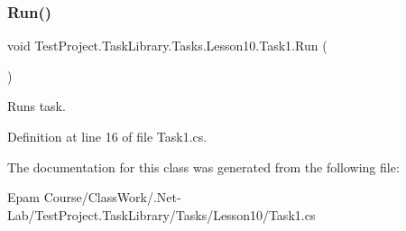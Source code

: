 \subsubsection{\texorpdfstring{Run()}{Run()}}
{\footnotesize\ttfamily void Test\+Project.\+Task\+Library.\+Tasks.\+Lesson10.\+Task1.\+Run (\begin{DoxyParamCaption}{ }\end{DoxyParamCaption})}



Runs task. 



Definition at line 16 of file Task1.\+cs.



The documentation for this class was generated from the following file\+:\begin{DoxyCompactItemize}
\item 
Epam Course/\+Class\+Work/.\+Net-\/\+Lab/\+Test\+Project.\+Task\+Library/\+Tasks/\+Lesson10/Task1.\+cs\end{DoxyCompactItemize}
